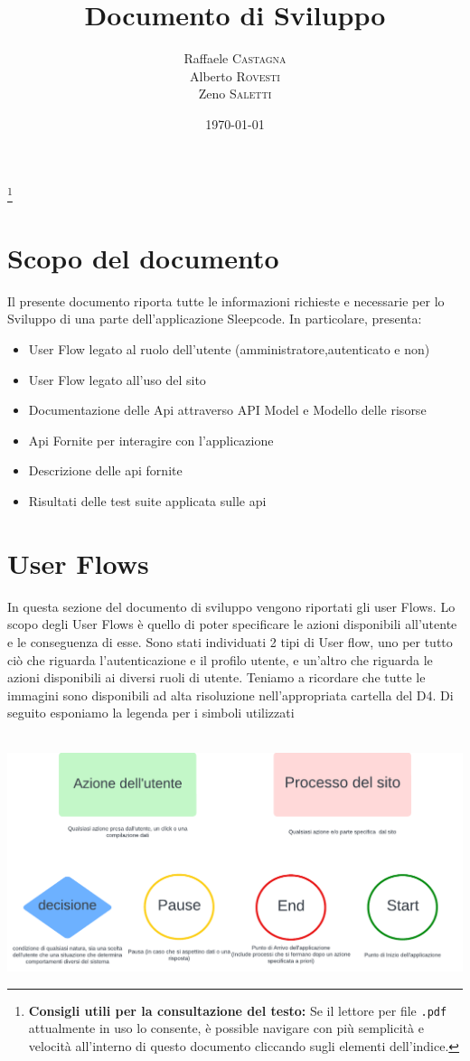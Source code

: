 \documentclass[11pt, a4paper]{article}
\title{Documento di Sviluppo}
\author{Raffaele \textsc{Castagna}\\
Alberto \textsc{Rovesti}\\
Zeno \textsc{Saletti}}
\date{\today}
\theoremstyle{definition}
\newcommand\blfootnote[1]{%
  \begingroup
  \renewcommand\thefootnote{}\footnote{#1}%
  \addtocounter{footnote}{-1}%
  \endgroup
}
\begin{document}


\tableofcontents\blfootnote{\textbf{Consigli utili per la consultazione del testo:} Se il lettore per file \texttt{.pdf} attualmente in uso lo consente, è possible navigare con più semplicità e velocità all'interno di questo documento cliccando sugli elementi dell'indice.}


\newpage
\section{Scopo del documento}
Il presente documento riporta tutte le informazioni richieste e necessarie per lo Sviluppo
di una parte dell'applicazione Sleepcode.
In particolare, presenta:
\begin{itemize}
  \item User Flow legato al ruolo dell'utente (amministratore,autenticato e non)
  \item User Flow legato all'uso del sito
  \item Documentazione delle Api attraverso API Model e Modello delle risorse
  \item Api Fornite per interagire con l'applicazione
  \item Descrizione delle api fornite
  \item Risultati delle test suite applicata sulle api
\end{itemize}


\newpage
\section{User Flows}
In questa sezione del documento di sviluppo vengono riportati gli user Flows. Lo scopo degli User Flows
è quello di poter specificare le azioni disponibili all'utente e le conseguenza di esse. Sono stati individuati 2 tipi di User flow, uno per 
tutto ciò che riguarda l'autenticazione e il profilo utente, e un'altro che riguarda le azioni disponibili ai diversi ruoli di utente.
Teniamo a ricordare che tutte le immagini sono disponibili ad alta risoluzione nell'appropriata cartella del D4.
Di seguito esponiamo la legenda per i simboli utilizzati
\\
\\
\begin{center}
  \includegraphics{materiale/UserFlow Symbols.png}
\end{center}
\newpage
\end{document}
